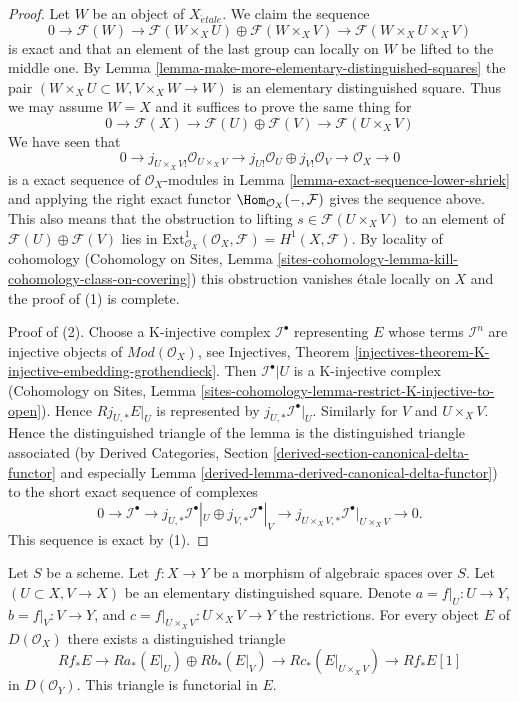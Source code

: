 \begin{proof}
Let $W$ be an object of $X_{\acute{e}tale}$. We claim the sequence
$$
0 \to
\mathcal{F}(W) \to
\mathcal{F}(W \times_X U) \oplus \mathcal{F}(W \times_X V) \to
\mathcal{F}(W \times_X U \times_X V)
$$
is exact and that an element of the last group can locally on $W$
be lifted to the middle one.
By Lemma \ref{lemma-make-more-elementary-distinguished-squares}
the pair $(W \times_X U \subset W, V \times_X W \to W)$ is an elementary
distinguished square. Thus we may assume $W = X$ and it suffices
to prove the same thing for
$$
0 \to
\mathcal{F}(X) \to
\mathcal{F}(U) \oplus \mathcal{F}(V) \to
\mathcal{F}(U \times_X V)
$$
We have seen that
$$
0 \to j_{U \times_X V!}\mathcal{O}_{U \times_X V}
\to j_{U!}\mathcal{O}_U \oplus
j_{V!}\mathcal{O}_V \to
\mathcal{O}_X \to 0
$$
is a exact sequence of $\mathcal{O}_X$-modules in
Lemma \ref{lemma-exact-sequence-lower-shriek} and applying
the right exact functor $\Hom_{\mathcal{O}_X}(- , \mathcal{F})$
gives the sequence above. This also means that the obstruction
to lifting $s \in \mathcal{F}(U \times_X V)$ to
an element of $\mathcal{F}(U) \oplus \mathcal{F}(V)$ lies in
$\text{Ext}^1_{\mathcal{O}_X}(\mathcal{O}_X, \mathcal{F}) =
H^1(X, \mathcal{F})$. By locality of cohomology
(Cohomology on Sites, Lemma
\ref{sites-cohomology-lemma-kill-cohomology-class-on-covering})
this obstruction vanishes \'etale locally on $X$ and the proof
of (1) is complete.

\medskip\noindent
Proof of (2).
Choose a K-injective complex $\mathcal{I}^\bullet$ representing $E$
whose terms $\mathcal{I}^n$ are injective objects of
$\textit{Mod}(\mathcal{O}_X)$, see Injectives, Theorem
\ref{injectives-theorem-K-injective-embedding-grothendieck}.
Then $\mathcal{I}^\bullet|U$ is a K-injective complex
(Cohomology on Sites, Lemma
\ref{sites-cohomology-lemma-restrict-K-injective-to-open}).
Hence $Rj_{U, *}E|_U$ is represented by $j_{U, *}\mathcal{I}^\bullet|_U$.
Similarly for $V$ and $U \times_X V$. Hence the distinguished triangle
of the lemma is the distinguished triangle associated (by
Derived Categories, Section
\ref{derived-section-canonical-delta-functor} and especially
Lemma \ref{derived-lemma-derived-canonical-delta-functor})
to the short exact sequence of complexes
$$
0 \to
\mathcal{I}^\bullet \to
j_{U, *}\mathcal{I}^\bullet|_U \oplus j_{V, *}\mathcal{I}^\bullet|_V \to
j_{U \times_X V, *}\mathcal{I}^\bullet|_{U \times_X V} \to
0.
$$
This sequence is exact by (1).
\end{proof}

\begin{lemma}
\label{lemma-unbounded-relative-mayer-vietoris}
Let $S$ be a scheme. Let $f : X \to Y$ be a morphism of algebraic spaces
over $S$. Let $(U \subset X, V \to X)$ be an elementary distinguished square.
Denote $a = f|_U : U \to Y$, $b = f|_V : V \to Y$, and
$c = f|_{U \times_X V} : U \times_X V \to Y$ the restrictions.
For every object $E$ of $D(\mathcal{O}_X)$ there exists a
distinguished triangle
$$
Rf_*E \to
Ra_*(E|_U) \oplus Rb_*(E|_V) \to
Rc_*(E|_{U \times_X V}) \to
Rf_*E[1]
$$
in $D(\mathcal{O}_Y)$. This triangle is functorial in $E$.
\end{lemma}

